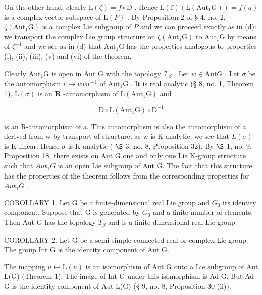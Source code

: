 On the other hand, clearly \(\mathrm{L}(\zeta) = f\circ \mathrm{D}\) . Hence \(\mathrm{L}(\zeta)(\mathrm{L}(\mathrm{Aut}_1\mathrm{G})) = f(a)\) is a complex vector subspace of \(\mathrm{L}(P)\) . By Proposition 2 of § 4, no. 2, \(\zeta (\mathrm{Aut}_1\mathrm{G})\) is a complex Lie subgroup of \(P\) and we can proceed exactly as in (d): we transport the complex Lie group structure on \(\zeta (\mathrm{Aut}_1\mathrm{G})\) to \(\mathrm{Aut}_1\mathrm{G}\) by means of \(\zeta^{-1}\) and we see as in (d) that \(\mathrm{Aut}_1\mathrm{G}\) has the properties analogous to properties (i), (ii), (iii), (v) and (vi) of the theorem.

Clearly \(\mathrm{Aut}_1\mathrm{G}\) is open in Aut G with the topology \(\mathcal{T}_{\beta}\) . Let \(w\in \mathrm{Aut}G\) . Let \(\sigma\) be the automorphism \(v\mapsto wvw^{-1}\) of \(\mathrm{Aut}_1\mathrm{G}\) . It is real analytic (§ 8, no. 1, Theorem 1), \(\mathrm{L}(\sigma)\) is an \(\mathbf{R}\) -automorphism of \(\mathrm{L}(\mathrm{Aut}_1\mathrm{G})\) and

\[
\mathrm{D} \circ \mathrm{L} (\mathrm{Aut} _ {1} \mathrm{G}) \circ \mathrm{D} ^ {- 1}
\]

is an R-automorphism of a. This automorphism is also the automorphism of a derived from w by transport of structure; as w is K-analytic, we see that \(L(\sigma)\) is K-linear. Hence \(\sigma\) is K-analytic ( \(\S\) 3, no. 8, Proposition 32). By \(\S\) 1, no. 9, Proposition 18, there exists on Aut G one and only one Lie K-group structure such that \(Aut_1G\) is an open Lie subgroup of Aut G. The fact that this structure has the properties of the theorem follows from the corresponding properties for \(Aut_1G\) .

COROLLARY 1. Let G be a finite-dimensional real Lie group and \(G_{0}\) its identity component. Suppose that G is generated by \(G_{0}\) and a finite number of elements. Then Aut G has the topology \(T_{\beta}\) and is a finite-dimensional real Lie group.

COROLLARY 2. Let G be a semi-simple connected real or complex Lie group. The group Int G is the identity component of Aut G.

The mapping \(u \mapsto \mathrm{L}(u)\) is an isomorphism of Aut G onto a Lie subgroup of Aut L(G) (Theorem 1). The image of Int G under this isomorphism is Ad G. But Ad G is the identity component of Aut L(G) (§ 9, no. 8, Proposition 30 (ii)).

